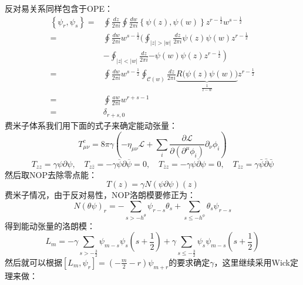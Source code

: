 反对易关系同样包含于OPE：
\begin{equation}
	\begin{aligned}
		\left\{\psi_{r},\psi_{s}\right\}=&\oint\frac{dz}{2\pi i}\oint\frac{dw}{2\pi i}\left\{\psi(z),\psi(w)\right\}z^{r-\frac{1}{2}}w^{s-\frac{1}{2}} \\
		=&\oint\frac{dw}{2\pi i}w^{s-\frac12}\Big(\oint_{|z|>|w|}\frac{dz}{2\pi i}\psi(z)\psi(w)z^{r-\frac12} \\
		&-\oint_{|z|<|w|}\frac{dz}{2\pi i}\left.-\psi(w)\psi(z)z^{r-\frac12}\right) \\
		=&\oint\frac{dw}{2\pi i}w^{s-\frac12}\oint_{\mathcal{C}(w)}\frac{dz}{2\pi i}\underbrace{R\big(\psi(z)\psi(w)\big)}_{\frac{1}{z-w}}z^{r-\frac12} \\
		=&\oint\frac{aw}{2\pi i}w^{r+s-1} \\
		=&\delta_{r+s,0}
	\end{aligned}
\end{equation}
费米子体系我们用下面的式子来确定能动张量：
\begin{equation}
	T_{\mu\nu}^c=8\pi\left.\gamma\left(-\eta_{\mu\nu}\mathcal{L}+\sum_i\frac{\partial\mathcal{L}}{\partial\left(\partial^\mu\phi_i\right)}\partial_\nu\phi_i\right)\right. 
\end{equation}
\begin{equation}
	T_{zz}=\gamma\psi\partial\psi,\quad T_{z\overline{z}}=-\gamma\overline{\psi}\partial\overline{\psi}=0,\quad T_{\overline{z}z}=-\gamma\psi\overline{\partial}\psi=0,\quad T_{\overline{z}z}=\gamma\bar{\psi}\bar{\partial}\bar{\psi}
\end{equation}
然后取NOP去除零点能：
\begin{equation}
	T(z)=\gamma N\left(\psi\partial\psi\right)(z)
\end{equation}
费米子情况，由于反对易性，NOP洛朗模要修正为：
\begin{equation}\label{eq:35.48}
	\boxed{
		N\left(\theta\psi\right)_r=-\sum_{s>-h^\theta}\psi_{r-s}\theta_s+\sum_{s\leq-h^\phi}\theta_s\psi_{r-s}
	}
\end{equation}
得到能动张量的洛朗模：
\begin{equation}\label{35.49}
	L_m=-\gamma\sum_{s>-\frac32}\psi_{m-s}\psi_s\left(s+\frac12\right)+\gamma\sum_{s\leq-\frac32}\psi_s\psi_{m-s}\left(s+\frac12\right)
\end{equation}
然后就可以根据$\left[L_m,\psi_r\right]=\left(-\frac m2-r\right)\psi_{m+r}$的要求确定$\gamma$，这里继续采用Wick定理来做：

